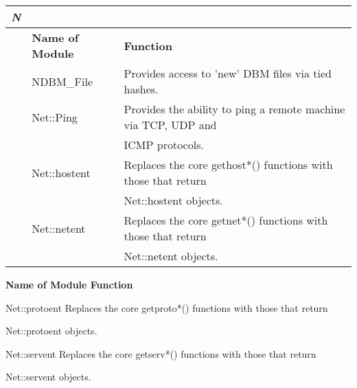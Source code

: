 \documentclass[a4paper,11pt]{book}
\begin{document}
\begin{tabular}{|p{0.2in}|p{1.0in}|p{2.9in}|}
\newline \textit{N} &  &  \\ \hline 
 & \textbf{Name of Module} & \textbf{Function} \\ \hline 
 & NDBM\_File & Provides access to 'new' DBM files via tied hashes. \\ \hline 
 & Net::Ping & Provides the ability to ping a remote machine via TCP, UDP and \\ \hline 
 &  & ICMP protocols. \\ \hline 
 & Net::hostent & Replaces the core gethost*() functions with those that return \\ \hline 
 &  & Net::hostent objects. \\ \hline 
 & Net::netent & Replaces the core getnet*() functions with those that return \\ \hline 
 &  & Net::netent objects. \\ \hline 
\end{tabular}



\noindent 

\noindent \textbf{Name of Module Function}

\noindent 

\noindent Net::protoent Replaces the core getproto*() functions with those that return

\noindent Net::protoent objects.

\noindent 

\noindent Net::servent Replaces the core getserv*() functions with those that return

\noindent Net::servent objects.
\end{document}
